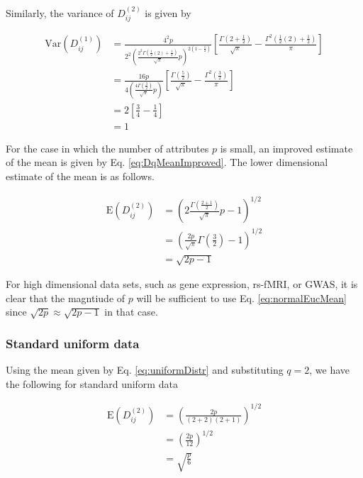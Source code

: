 \documentclass[10pt,letterpaper]{article}\usepackage[]{graphicx}\usepackage[]{color}
\begin{document}
Similarly, the variance of $D^{(2)}_{ij}$ is given by

\begin{equation}\label{eq:normalEucVar}
\begin{aligned}
\text{Var}\left(D^{(1)}_{ij}\right) &= \frac{4^2p}{2^2\left(\frac{2^2\Gamma\left(\frac{1}{2}(2) + \frac{1}{2}\right)}{\sqrt{\pi}}p\right)^{2\left(1 - \frac{1}{2}\right)}}\left[\frac{\Gamma\left(2 + \frac{1}{2}\right)}{\sqrt{\pi}} - \frac{\Gamma^2\left(\frac{1}{2}(2) + \frac{1}{2}\right)}{\pi}\right] \\
&= \frac{16p}{4\left(\frac{4\Gamma\left(\frac{3}{2}\right)}{\sqrt{\pi}}p\right)}\left[\frac{\Gamma\left(\frac{5}{2}\right)}{\sqrt{\pi}} - \frac{\Gamma^2\left(\frac{3}{2}\right)}{\pi}\right] \\
&= 2\left[\frac{3}{4} - \frac{1}{4}\right] \\
&= 1 
\end{aligned}
\end{equation}

For the case in which the number of attributes $p$ is small, an improved estimate of the mean is given by Eq. \ref{eq:DqMeanImproved}. The lower dimensional estimate of the mean is as follows.

\begin{equation}\label{eq:normalEucMeanImproved}
\begin{aligned}
\text{E}\left(D^{(2)}_{ij}\right) &= \left(2\frac{\Gamma\left(\frac{2 + 1}{2}\right)}{\sqrt{\pi}}p - 1\right)^{1/2} \\
&= \left(\frac{2p}{\sqrt{\pi}}\Gamma\left(\frac{3}{2}\right) - 1\right)^{1/2} \\
&= \sqrt{2p - 1}
\end{aligned}
\end{equation}

For high dimensional data sets, such as gene expression, rs-fMRI, or GWAS, it is clear that the magntiude of $p$ will be sufficient to use Eq. \ref{eq:normalEucMean} since $\sqrt{2p} \approx \sqrt{2p - 1}$ in that case.

\subsubsection{Standard uniform data}

Using the mean given by Eq. \ref{eq:uniformDistr} and substituting $q=2$, we have the following for standard uniform data

\begin{equation}\label{eq:uniformEucMean}
\begin{aligned}
\text{E}\left(D^{(2)}_{ij}\right) &= \left(\frac{2p}{(2+2)(2+1)}\right)^{1/2} \\
&= \left(\frac{2p}{12}\right)^{1/2} \\
&= \sqrt{\frac{p}{6}}
\end{aligned}
\end{equation}
\end{document}
